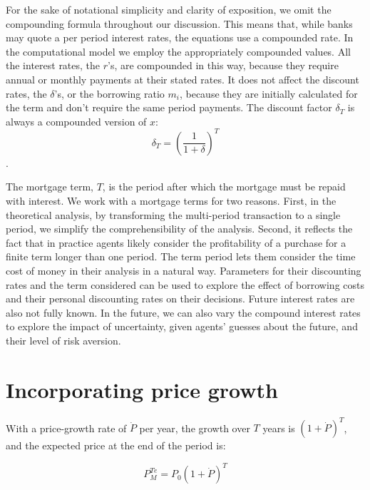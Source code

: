 For the sake of notational simplicity and clarity of exposition,  we omit the compounding formula throughout our discussion. This means that, while banks may quote a per period interest rates, the equations use a compounded rate. In the computational model we employ the appropriately compounded values. All %
 the interest rates, the $r$'s, are compounded in this way, because they require annual or monthly payments at their stated rates.
 It does not affect the discount rates, the $\delta$'s, or the borrowing ratio $m_i$, because they are initially calculated for the term and don't require the same period payments.
 The discount factor $\delta_T$ is always a compounded version of $x$:
 \[\delta_T=\left(\frac{1}{1+\delta}\right)^T\].

 The {mortgage term}, $T$, is the period after which the mortgage must be repaid with interest. We work with a mortgage terms for two reasons. First, in the theoretical analysis, by transforming the multi-period transaction to a single period, we simplify the comprehensibility of the analysis. Second, it reflects the fact that in practice agents  likely consider the profitability of a purchase for a finite term longer than one period. The term period lets them consider the time cost of money in their analysis in a natural way. Parameters for their discounting rates and the term considered can be used to explore the effect of borrowing costs and their personal discounting rates on their decisions. Future interest rates are also not fully known. In the future, we can also vary the compound interest rates to explore the impact of uncertainty, given agents' guesses about the future, and their level of risk aversion.

 
\section{Incorporating price growth}\label{sec_model_price_expectataions}

With a price-growth rate of $\dot P$ per year, the growth over $T$ years is $(1+\dot P)^T$, and  %
the expected price at the end of the period is:

\[P_M^{Te}=P_0(1+\dot P)^T\]

